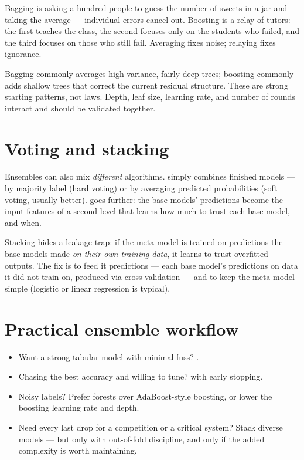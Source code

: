 \begin{analogy}
Bagging is asking a hundred people to guess the number of sweets in a jar and taking the average --- individual errors cancel out. Boosting is a relay of tutors: the first teaches the class, the second focuses only on the students who failed, and the third focuses on those who still fail. Averaging fixes noise; relaying fixes ignorance.
\end{analogy}

\begin{keyidea}
Bagging commonly averages high-variance, fairly deep trees; boosting commonly adds shallow trees that correct the current residual structure. These are strong starting patterns, not laws. Depth, leaf size, learning rate, and number of rounds interact and should be validated together.
\end{keyidea}

\section{Voting and stacking}

Ensembles can also mix \emph{different} algorithms.  simply combines finished models --- by majority label (hard voting) or by averaging predicted probabilities (soft voting, usually better).  goes further: the base models' predictions become the input features of a second-level  that learns how much to trust each base model, and when.

Stacking hides a leakage trap: if the meta-model is trained on predictions the base models made \emph{on their own training data}, it learns to trust overfitted outputs. The fix is to feed it  predictions --- each base model's predictions on data it did not train on, produced via cross-validation --- and to keep the meta-model simple (logistic or linear regression is typical).

\section{Practical ensemble workflow}

\begin{itemize}
  \item Want a strong tabular model with minimal fuss? .
  \item Chasing the best accuracy and willing to tune?  with early stopping.
  \item Noisy labels? Prefer forests over AdaBoost-style boosting, or lower the boosting learning rate and depth.
  \item Need every last drop for a competition or a critical system? Stack diverse models --- but only with out-of-fold discipline, and only if the added complexity is worth maintaining.
\end{itemize}

